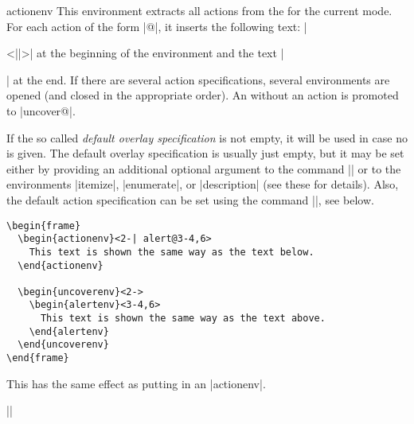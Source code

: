 \begin{environment}{{actionenv}}
  This environment extracts all actions from the  for the current mode. For each action of the form
  |@|, it inserts the following text:
  |\begin{|\meta{action}|env}<||>| at the
  beginning of the environment and the text |\end{|\meta{action}|env}|
  at the end. If there are several action specifications, several
  environments are opened (and closed in the appropriate order). An
   without an action is promoted to
  |uncover@|.

  If the so called \emph{default overlay specification} is not empty,
  it will be used in case no  is given. The
  default overlay specification is usually just empty, but it may be
  set either by providing an additional optional argument to the
  command |\frame| or to the environments |itemize|, |enumerate|, or
  |description| (see these for details). Also, the default action
  specification can be set using the command
  |\beamerdefaultoverlayspecification|, see below.

  \example
\begin{verbatim}
\begin{frame}
  \begin{actionenv}<2-| alert@3-4,6>
    This text is shown the same way as the text below.
  \end{actionenv}

  \begin{uncoverenv}<2->
    \begin{alertenv}<3-4,6>
      This text is shown the same way as the text above.
    \end{alertenv}
  \end{uncoverenv}
\end{frame}
\end{verbatim}
\end{environment}

\begin{command}{\action{}}
  This has the same effect as putting  in an |actionenv|.

  \example ||
\end{command}

